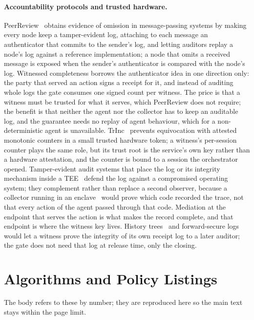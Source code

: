 \documentclass[letterpaper,10pt,twocolumn]{article}
\theoremstyle{definition}
\begin{document}
\paragraph{Accountability protocols and trusted hardware.} PeerReview~\cite{haeberlen2007peerreview} obtains evidence of omission in message-passing systems by making every node keep a tamper-evident log, attaching to each message an authenticator that commits to the sender's log, and letting auditors replay a node's log against a reference implementation; a node that omits a received message is exposed when the sender's authenticator is compared with the node's log. Witnessed completeness borrows the authenticator idea in one direction only: the party that served an action signs a receipt for it, and instead of auditing whole logs the gate consumes one signed count per witness. The price is that a witness must be trusted for what it serves, which PeerReview does not require; the benefit is that neither the agent nor the collector has to keep an auditable log, and the guarantee needs no replay of agent behaviour, which for a non-deterministic agent is unavailable. TrInc~\cite{levin2009trinc} prevents equivocation with attested monotonic counters in a small trusted hardware token; a witness's per-session counter plays the same role, but its trust root is the service's own key rather than a hardware attestation, and the counter is bound to a session the orchestrator opened. Tamper-evident audit systems that place the log or its integrity mechanism inside a TEE~\cite{paccagnella2020custos, ahmad2022hardlog} defend the log against a compromised operating system; they complement rather than replace a second observer, because a collector running in an enclave~\cite{costan2016sgxexplained} would prove which code recorded the trace, not that every action of the agent passed through that code. Mediation at the endpoint that serves the action is what makes the record complete, and that endpoint is where the witness key lives. History trees~\cite{crosby2009tamperevident} and forward-secure logs~\cite{schneier1999secureauditlogs} would let a witness prove the integrity of its own receipt log to a later auditor; the gate does not need that log at release time, only the closing.

\section{Algorithms and Policy Listings}\label{sec:appendix_listings}
The body refers to these by number; they are reproduced here so the main
text stays within the page limit.
\end{document}
